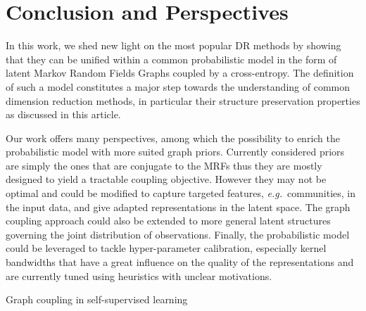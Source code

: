 \section{Conclusion and Perspectives}\label{Perspectives}

In this work, we shed new light on the most popular DR methods by showing that they can be unified within a common probabilistic model in the form of latent Markov Random Fields Graphs coupled by a cross-entropy. The definition of such a model constitutes a major step towards the understanding of common dimension reduction methods, in particular their structure preservation properties as discussed in this article. 

Our work offers many perspectives, among which the possibility to enrich the probabilistic model with more suited graph priors. Currently considered priors are simply the ones that are conjugate to the MRFs thus they are mostly designed to yield a tractable coupling objective. However they may not be optimal and could be modified to capture targeted features, \textit{e.g.}\ communities, in the input data, and give adapted representations in the latent space. The graph coupling approach could also be extended to more general latent structures governing the joint distribution of observations.
Finally, the probabilistic model could be leveraged to tackle hyper-parameter calibration, especially kernel bandwidths that have a great influence on the quality of the representations and are currently tuned using heuristics with unclear motivations.

\begin{mem1}{Graph coupling in self-supervised learning}
    \cite{tan2023contrastive}
\end{mem1}